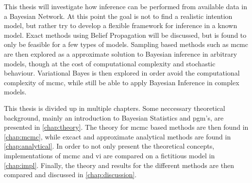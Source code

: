 This thesis will investigate how inference can be performed from available data in a Bayesian Network. At this point the goal is not to find a realistic intention model, but rather try to develop a flexible framework for inference in a known model. Exact methods using Belief Propagation will be discussed, but is found to only be feasible for a few types of models. Sampling based methods such as \acrshort{mcmc} are then explored as a approximate solution to Bayesian inference in arbitrary models, though at the cost of computational complexity and stochastic behaviour. Variational Bayes is then explored in order avoid the computational complexity of \acrshort{mcmc}, while still be able to apply Bayesian Inference in complex models.  

This thesis is divided up in multiple chapters. Some neccessary theoretical background, mainly an introduction to Bayesian Statistics and \acrfull{pgm}'s, are presented in \cref{chap:theory}. The theory for \acrshort{mcmc} based methods are then found in \cref{chap:mcmc}, while excact and approximate analytical methods are found in \cref{chap:analytical}. In order to not only present the theoretical concepts, implementations of \acrshort{mcmc} and \acrshort{vi} are compared on a fictitious model in \cref{chap:impl}. Finally, the theory and results for the different methods are then compared and discussed in \cref{chap:discussion}.
